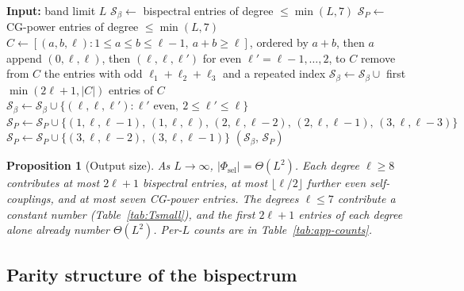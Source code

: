 \documentclass{article}
\newtheorem{proposition}[theorem]{Proposition}
\theoremstyle{definition}
\theoremstyle{remark}
\theoremstyle{definition}
\begin{document}
\begin{algorithm}[H]
\caption{Index set of the augmented selective spherical bispectrum at
  band limit~$L$, as implemented. Returns the bispectral triples
  $\mathcal{S}_\beta$ and the CG-power triples $\mathcal{S}_P$.}
\label{alg:so3-augmented}
\small
\begin{algorithmic}[1]
\STATE \textbf{Input:} band limit $L$
\STATE $\mathcal{S}_\beta \leftarrow$ bispectral entries of degree
  $\le\min(L,7)$ 
\STATE $\mathcal{S}_P \leftarrow$ CG-power entries of
  degree $\le\min(L,7)$ 
  \STATE $C \leftarrow [(a,b,\ell) : 1\le a\le b\le\ell{-}1,\
    a{+}b\ge\ell]$, ordered by $a{+}b$, then $a$
  \STATE append $(0,\ell,\ell)$, then $(\ell,\ell,\ell')$ for even
    $\ell' = \ell{-}1, \dotsc, 2$, to $C$
  \STATE remove from $C$ the entries with odd $\ell_1{+}\ell_2{+}\ell_3$
    and a repeated index 
  \STATE $\mathcal{S}_\beta \leftarrow \mathcal{S}_\beta \cup$ first
    $\min(2\ell{+}1, |C|)$ entries of $C$
  \STATE $\mathcal{S}_\beta \leftarrow \mathcal{S}_\beta \cup
    \{(\ell,\ell,\ell') : \ell'\text{ even},\ 2\le\ell'\le\ell\}$
    \COMMENT{even self-couplings}
  \STATE $\mathcal{S}_P \leftarrow \mathcal{S}_P \cup
    \{(1,\ell,\ell{-}1),\, (1,\ell,\ell),\, (2,\ell,\ell{-}2),\,
    (2,\ell,\ell{-}1),\, (3,\ell,\ell{-}3)\}$
    \STATE $\mathcal{S}_P \leftarrow \mathcal{S}_P \cup
      \{(3,\ell,\ell{-}2),\, (3,\ell,\ell{-}1)\}$
  \ENDIF
\ENDFOR
\RETURN $(\mathcal{S}_\beta,\, \mathcal{S}_P)$
\end{algorithmic}
\end{algorithm}

\begin{proposition}[Output size]\label{prop:app-output-size}
As $L\to\infty$, $|\Phi_{\mathrm{sel}}| = \Theta(L^2)$. Each degree
$\ell\ge 8$ contributes at most $2\ell{+}1$ bispectral entries, at most $\lfloor\ell/2\rfloor$ further even self-couplings,
and at most seven CG-power entries. The degrees $\ell\le 7$
contribute a constant number (Table~\ref{tab:Tsmall}), and the first $2\ell{+}1$ entries of each degree alone
already number $\Theta(L^2)$. Per-$L$ counts are in
Table~\ref{tab:app-counts}.
\end{proposition}



\subsection{Parity structure of the bispectrum}
\label{sec:app-parity}
\end{document}

